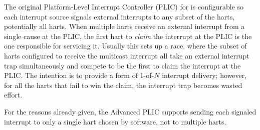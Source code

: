 \begin{commentary}
The original Platform-Level Interrupt Controller (PLIC) for {\RISCV}
is configurable so each interrupt source signals external interrupts to
any subset of the harts, potentially all harts.
When multiple harts receive an external interrupt from a single cause
at the PLIC, the first hart to \emph{claim} the interrupt at the PLIC
is the one responsible for servicing it.
Usually this sets up a race, where the subset of harts configured to
receive the multicast interrupt all take an external interrupt trap
simultaneously and compete to be the first to claim the interrupt at
the PLIC.
The intention is to provide a form of \mbox{1-of-$N$} interrupt
delivery;
however, for all the harts that fail to win the claim, the interrupt
trap becomes wasted effort.

For the reasons already given, the Advanced PLIC supports sending each
signaled interrupt to only a single hart chosen by software, not to
multiple harts.
\end{commentary}

